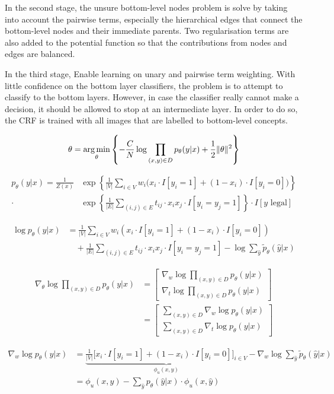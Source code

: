 \documentclass[11pt,a4paper]{article}
\newcommand{\argmin}{\operatornamewithlimits{arg\,min}}
\begin{document}
In the second stage, the unsure bottom-level nodes problem is solve by taking into account the pairwise terms, especially the hierarchical edges that connect the bottom-level nodes and their immediate parents. Two regularisation terms are also added to the potential function so that the contributions from nodes and edges are balanced.

In the third stage, Enable learning on unary and pairwise term weighting. With little confidence on the bottom layer classifiers, the problem is to attempt to classify to the bottom layers. However, in case the classifier really cannot make a decision, it should be allowed to stop at an intermediate layer. In order to do so, the CRF is trained with all images that are labelled to bottom-level concepts.

\[\theta=\argmin_\theta\left\{-\frac{C}{N}\log\prod_{(x,y)\in D}p_\theta(y|x)+\frac{1}{2}\|\theta\|^2\right\}\]

\begin{align*}
p_\theta(y|x)=\frac{1}{Z(x)}&\exp\left\{\frac{1}{|V|}\sum_{i\in V}w_i\big(x_i\cdot I[y_i=1]+(1-x_i)\cdot I[y_i=0]\big)\right\}\\
\cdot&\exp\left\{\frac{1}{|E|}\sum_{(i,j)\in E}t_{ij}\cdot x_ix_j\cdot I[y_i=y_j=1]\right\}\cdot I[y\text{ legal}]
\end{align*}

\begin{align*}
\log p_\theta(y|x)&=\frac{1}{|V|}\sum_{i\in V}w_i(x_i\cdot I[y_i=1]+(1-x_i)\cdot I[y_i=0])\\
&\quad+\frac{1}{|E|}\sum_{(i,j)\in E}t_{ij}\cdot x_ix_j\cdot I[y_i=y_j=1]-\log\sum_{\hat{y}}\tilde{p}_\theta(\hat{y}|x)
\end{align*}

\begin{align*}
\nabla_\theta\log\prod_{(x,y)\in D}p_\theta(y|x)&=\begin{bmatrix}
\nabla_w\log\prod_{(x,y)\in D}p_\theta(y|x)\\ 
\nabla_t\log\prod_{(x,y)\in D}p_\theta(y|x)
\end{bmatrix}\\
&=\begin{bmatrix}
\sum_{(x,y)\in D}\nabla_w\log p_\theta(y|x)\\ 
\sum_{(x,y)\in D}\nabla_t\log p_\theta(y|x)
\end{bmatrix}
\end{align*}

\begin{align*}
\nabla_w\log p_\theta(y|x)&=\underbrace{\frac{1}{|V|}\Big[x_i\cdot I[y_i=1]+(1-x_i)\cdot I[y_i=0]\Big]_{i\in V}}_{\phi_u(x,y)}-\nabla_w\log\sum_{\hat{y}}\tilde{p}_\theta(\hat{y}|x)\\
&=\phi_u(x,y)-\sum_{\hat{y}}p_\theta(\hat{y}|x)\cdot\phi_u(x,\hat{y})
\end{align*}
\end{document}
